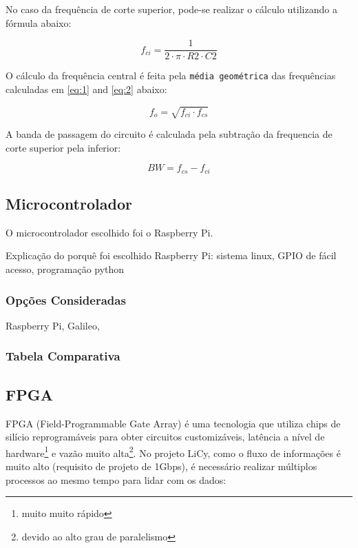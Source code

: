 	No caso da frequência de corte superior, pode-se realizar o cálculo utilizando a fórmula abaixo:
	
	\begin{equation} \label{eq:2}
	f_{ci} = \frac{1}{2 \cdot \pi \cdot R2 \cdot C2}
	\end{equation}
	
	O cálculo da frequência central é feita pela \texttt{média geométrica} das frequências calculadas em \ref{eq:1} and \ref{eq:2} abaixo: 
	
	\begin{equation} \label{eq:3}
	f_{o} = \sqrt{f_{ci} \cdot f_{cs}}
	\end{equation}
	
	A banda de passagem do circuito é calculada pela subtração da frequencia de corte superior pela inferior:
	
	\begin{equation} \label{eq:4}
	BW = f_{cs} - f_{ci}
	\end{equation}

	\subsection{Microcontrolador}\label{hard-uc}
	
	O microcontrolador escolhido foi o Raspberry Pi.

	
	Explicação do porquê foi escolhido Raspberry Pi: sistema linux, GPIO de fácil acesso, programação python
	
	\subsubsection{Opções Consideradas}\label{uc-options}
	
	Raspberry Pi, Galileo, 
	
	\subsubsection{Tabela Comparativa}\label{uc-table}
	
	\subsection{FPGA}\label{hard-fpga}
	
	FPGA (Field-Programmable Gate Array) é uma tecnologia que utiliza chips de silício reprogramáveis para obter circuitos customizáveis, latência a nível de hardware\footnote{muito muito rápido} e vazão muito alta\footnote{devido ao alto grau de paralelismo}. No projeto LiCy, como o fluxo de informações é muito alto (requisito de projeto de 1Gbps), é necessário realizar múltiplos processos ao mesmo tempo para lidar com os dados:
	
